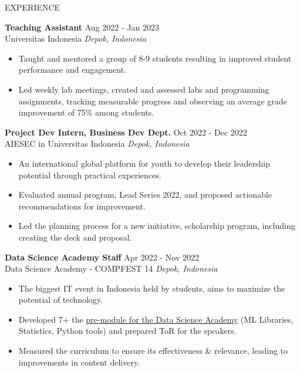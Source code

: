 \documentclass{resume} %
\begin{document}
\begin{rSection}{EXPERIENCE}

\textbf{Teaching Assistant} \hfill Aug 2022 - Jan 2023 \\
Universitas Indonesia \hfill \textit{Depok, Indonesia}
\vspace{-0.75em}
\begin{itemize}
\itemsep -7pt {}
\item Taught and mentored a group of 8-9 students resulting in improved student performance and engagement.
\item Led weekly lab meetings, created and assessed labs and programming assignments, tracking measurable progress and observing an average grade improvement of 75\% among students.
 \end{itemize}
 \vspace{-0.5em}

\textbf{Project Dev Intern, Business Dev Dept.} \hfill Oct 2022 - Dec 2022 \\
AIESEC in Universitas Indonesia \hfill \textit{Depok, Indonesia}
\vspace{-0.75em}
\begin{itemize}
\itemsep -7pt {}
\item An international global platform for youth to develop their leadership potential through practical experiences.
\item Evaluated annual program, Lead Series 2022, and proposed actionable recommendations for improvement.
\item Led the planning process for a new initiative, scholarship program, including creating the deck and proposal.
 \end{itemize}
 \vspace{-0.5em}

\textbf{Data Science Academy Staff} \hfill Apr 2022 - Nov 2022 \\
Data Science Academy - COMPFEST 14 \hfill \textit{Depok, Indonesia}
\vspace{-0.75em}
\begin{itemize}
\itemsep -7pt {}
\item The biggest IT event in Indonesia held by students, aims to maximize the potential of technology.
\item Developed 7+ the \href{https://south-tomato-2e2.notion.site/Pre-Module-Data-Science-Academy-ee098d9d28b7496eb45d3cd2555e1168?pvs=4}{pre-module for the Data Science Academy} (ML Libraries, Statistics, Python tools) and prepared ToR for the speakers.
\item Measured the curriculum to ensure its effectiveness \& relevance, leading to improvements in content delivery.
 \end{itemize}
 \vspace{-0.5em}


\end{rSection} 
\end{document}
